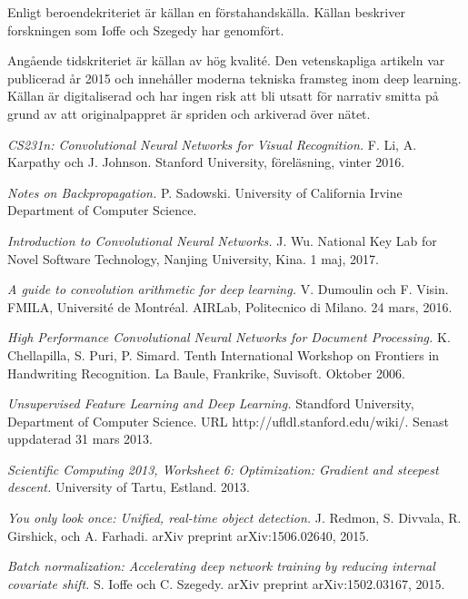 \documentclass[a4paper,11pt,twoside]{article}
\begin{document}
Enligt beroendekriteriet är källan en förstahandskälla. Källan beskriver forskningen som Ioffe och Szegedy har genomfört. 

Angående tidskriteriet är källan av hög kvalité. Den vetenskapliga artikeln var publicerad år 2015 och innehåller moderna tekniska framsteg inom deep learning. Källan är digitaliserad och har ingen risk att bli utsatt för narrativ smitta på grund av att originalpappret är spriden och arkiverad över nätet. 

\begin{thebibliography}{99}	
	\textit{CS231n: Convolutional Neural Networks for Visual Recognition.}
    F. Li, A. Karpathy och J. Johnson.
	Stanford University, föreläsning, vinter 2016.
	
	\textit{Notes on Backpropagation.}
    P. Sadowski.
    University of California Irvine	Department of Computer Science.
    
	\textit{Introduction to Convolutional Neural Networks.}
    J. Wu. 
    National Key Lab for Novel Software Technology, Nanjing University, Kina.
    1 maj, 2017.

	\textit{A guide to convolution arithmetic for deep learning.}
    V. Dumoulin  och F. Visin.
    FMILA, Université de Montréal. AIRLab, Politecnico di Milano.
	24 mars, 2016.

	\textit{High Performance Convolutional Neural Networks for Document Processing.}
    K. Chellapilla, S. Puri, P. Simard.
    Tenth International Workshop on Frontiers in Handwriting Recognition. 
    La Baule, Frankrike, Suvisoft.
	Oktober 2006.

	\textit{Unsupervised Feature Learning and Deep Learning.}
    Standford University, Department of Computer Science.
    URL http://ufldl.stanford.edu/wiki/.
	Senast uppdaterad 31 mars 2013.
	
	\textit{Scientific Computing 2013, Worksheet 6: Optimization: Gradient and steepest descent.}
    University of Tartu, Estland.
    2013.
    
	\textit{You only look once: Unified, real-time object detection.}
    J. Redmon, S. Divvala, R. Girshick, och A. Farhadi. 
    arXiv preprint arXiv:1506.02640, 2015.
    
	\textit{Batch normalization: Accelerating deep network training by reducing internal covariate shift.}
    S. Ioffe och C. Szegedy. 
	arXiv preprint arXiv:1502.03167, 2015.
    

\end{thebibliography}
\end{document}
